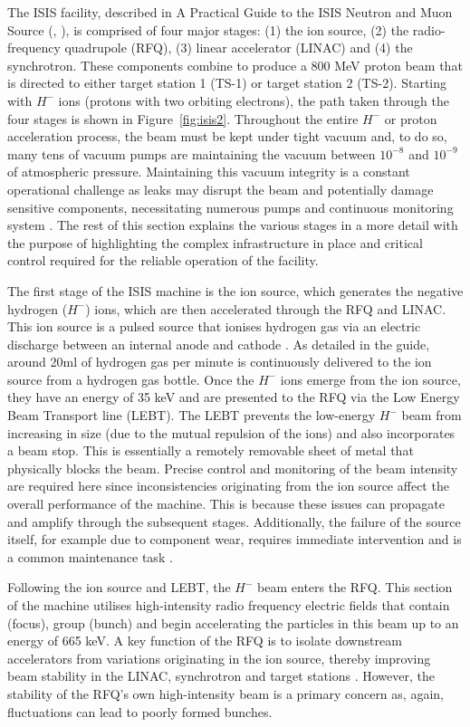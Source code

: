 \documentclass[10pt,oneside]{report}
\renewcommand{\citet}[1]{\citeauthor{#1}, \citeyear{#1}}
\begin{document}
The ISIS facility, described in A Practical Guide to the ISIS Neutron and Muon Source (\citet{2021practicalguide}), is comprised of four major stages: (1) the ion source, (2) the radio-frequency quadrupole (RFQ), (3) linear accelerator (LINAC) and (4) the synchrotron. These components combine to produce a 800 MeV proton beam that is directed to either target station 1 (TS-1) or target station 2 (TS-2). Starting with $H^-$ ions (protons with two orbiting electrons), the path taken through the four stages is shown in Figure~\ref{fig:isis2}. Throughout the entire $H^-$ or proton acceleration process, the beam must be kept under tight vacuum and, to do so, many tens of vacuum pumps are maintaining the vacuum between $10^{-8}$ and $10^{-9}$ of atmospheric pressure. Maintaining this vacuum integrity is a constant operational challenge as leaks may disrupt the beam and potentially damage sensitive components, necessitating numerous pumps and continuous monitoring system \cite{2021practicalguide}. The rest of this section explains the various stages in a more detail with the purpose of highlighting the complex infrastructure in place and critical control required for the reliable operation of the facility.

The first stage of the ISIS machine is the ion source, which generates the negative hydrogen ($H^-$) ions, which are then accelerated through the RFQ and LINAC. This ion source is a pulsed source that ionises hydrogen gas via an electric discharge between an internal anode and cathode \cite{2021practicalguide}. As detailed in the guide, around 20ml of hydrogen gas per minute is continuously delivered to the ion source from a hydrogen gas bottle. Once the $H^-$ ions emerge from the ion source, they have an energy of 35 keV and are presented to the RFQ via the Low Energy Beam Transport line (LEBT). The LEBT prevents the low-energy $H^-$ beam from increasing in size (due to the mutual repulsion of the ions) and also incorporates a beam stop. This is essentially a remotely removable sheet of metal that physically blocks the beam. Precise control and monitoring of the beam intensity are required here since inconsistencies originating from the ion source affect the overall performance of the machine. This is because these issues can propagate and amplify through the subsequent stages. Additionally, the failure of the source itself, for example due to component wear, requires immediate intervention and is a common maintenance task \cite{2021practicalguide}.

Following the ion source and LEBT, the $H^-$ beam enters the RFQ. This section of the machine utilises high-intensity radio frequency electric fields that contain (focus), group (bunch) and begin accelerating the particles in this beam up to an energy of 665 keV. A key function of the RFQ is to isolate downstream accelerators from variations originating in the ion source, thereby improving beam stability in the LINAC, synchrotron and target stations \cite{2021practicalguide}. However, the stability of the RFQ's own high-intensity beam is a primary concern as, again, fluctuations can lead to poorly formed bunches.
\end{document}
